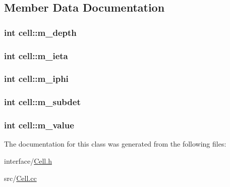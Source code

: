 \subsection{Member Data Documentation}
\hypertarget{classcell_a4630e40542df2a31653c1cb977c9c5a0}{}
\subsubsection[{m\+\_\+depth}]{\setlength{\rightskip}{0pt plus 5cm}int cell\+::m\+\_\+depth}\label{classcell_a4630e40542df2a31653c1cb977c9c5a0}
\hypertarget{classcell_a5713cffee48ca71ff4c1819c5ed5b0eb}{}
\subsubsection[{m\+\_\+ieta}]{\setlength{\rightskip}{0pt plus 5cm}int cell\+::m\+\_\+ieta}\label{classcell_a5713cffee48ca71ff4c1819c5ed5b0eb}
\hypertarget{classcell_ac9ffc40e1e156ea6db34bc26c7614aba}{}
\subsubsection[{m\+\_\+iphi}]{\setlength{\rightskip}{0pt plus 5cm}int cell\+::m\+\_\+iphi}\label{classcell_ac9ffc40e1e156ea6db34bc26c7614aba}
\hypertarget{classcell_a032a6f28cc331dbcc9bde99b1ddff042}{}
\subsubsection[{m\+\_\+subdet}]{\setlength{\rightskip}{0pt plus 5cm}int cell\+::m\+\_\+subdet}\label{classcell_a032a6f28cc331dbcc9bde99b1ddff042}
\hypertarget{classcell_a8bdaee6cc850bfe6ef988c29888c7182}{}
\subsubsection[{m\+\_\+value}]{\setlength{\rightskip}{0pt plus 5cm}int cell\+::m\+\_\+value}\label{classcell_a8bdaee6cc850bfe6ef988c29888c7182}


The documentation for this class was generated from the following files\+:\begin{DoxyCompactItemize}
\item 
interface/\hyperlink{_cell_8h}{Cell.\+h}\item 
src/\hyperlink{_cell_8cc}{Cell.\+cc}\end{DoxyCompactItemize}
